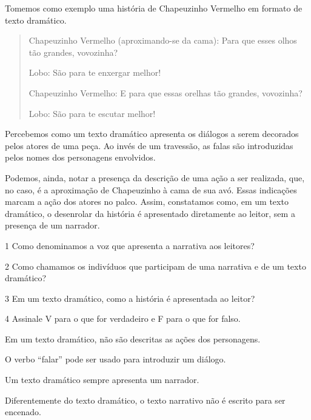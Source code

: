 {Tomemos como exemplo uma história de Chapeuzinho
Vermelho em formato de texto dramático.

\begin{quote}
Chapeuzinho Vermelho (aproximando-se da cama): Para que esses olhos
tão grandes, vovozinha?

Lobo: São para te enxergar melhor!

Chapeuzinho Vermelho: E para que essas orelhas tão grandes, vovozinha?

Lobo: São para te escutar melhor!
\end{quote}

Percebemos como um texto dramático apresenta os diálogos a serem
decorados pelos atores de uma peça. Ao invés de um travessão, as falas são introduzidas pelos nomes dos personagens envolvidos.

Podemos, ainda, notar a presença da descrição de uma ação a ser realizada, que,
no caso, é a aproximação de Chapeuzinho à cama de sua avó. Essas indicações marcam a ação dos atores no palco. Assim,
constatamos como, em um texto dramático, o desenrolar da história é
apresentado diretamente ao leitor, sem a presença de um narrador.}


\num{1} Como denominamos a voz que apresenta a narrativa aos leitores?


\num{2} Como chamamos os indivíduos que participam de uma narrativa e de um
texto dramático?


\num{3} Em um texto dramático, como a história é apresentada ao leitor?


\num{4} Assinale V para o que for verdadeiro e F para o que for falso.

\begin{boxlist}
 Em um texto dramático, não são descritas as ações dos personagens.

 O verbo “falar” pode ser usado para introduzir um diálogo.

 Um texto dramático sempre apresenta um narrador.

 Diferentemente do texto dramático, o texto narrativo não é escrito para ser encenado.
\end{boxlist}

